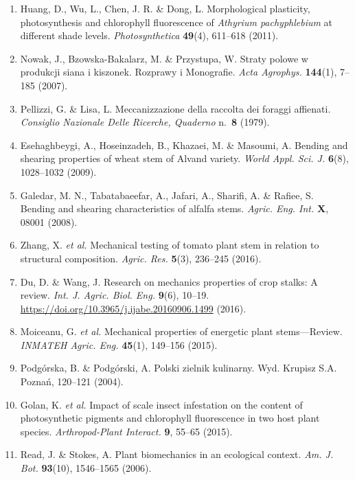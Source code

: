 \documentclass[
]{article}
\begin{document}
\begin{enumerate}
  Kalaji, H. M. \emph{et al.} Chlorophyll \emph{a} fluorescence as a
  tool to monitor physiological status of plants under abiotic stress
  conditions. \emph{Acta Physiol. Plant.} \textbf{38}(102), 1--11
  (2016).
\item
  Huang, D., Wu, L., Chen, J. R. \& Dong, L. Morphological plasticity,
  photosynthesis and chlorophyll fluorescence of \emph{Athyrium
  pachyphlebium} at different shade levels. \emph{Photosynthetica}
  \textbf{49}(4), 611--618 (2011).
\item
  Nowak, J., Bzowska-Bakalarz, M. \& Przystupa, W. Straty polowe w
  produkcji siana i kiszonek. Rozprawy i Monografie. \emph{Acta
  Agrophys.} \textbf{144}(1), 7--185 (2007).
\item
  Pellizzi, G. \& Lisa, L. Meccanizzazione della raccolta dei foraggi
  affienati. \emph{Consiglio Nazionale Delle Ricerche, Quaderno}
  n.~\textbf{8} (1979).
\item
  Esehaghbeygi, A., Hoseinzadeh, B., Khazaei, M. \& Masoumi, A. Bending
  and shearing properties of wheat stem of Alvand variety. \emph{World
  Appl. Sci. J.} \textbf{6}(8), 1028--1032 (2009).
\item
  Galedar, M. N., Tabatabaeefar, A., Jafari, A., Sharifi, A. \& Rafiee,
  S. Bending and shearing characteristics of alfalfa stems. \emph{Agric.
  Eng. Int.} \textbf{X}, 08001 (2008).
\item
  Zhang, X. \emph{et al.} Mechanical testing of tomato plant stem in
  relation to structural composition. \emph{Agric. Res.} \textbf{5}(3),
  236--245 (2016).
\item
  Du, D. \& Wang, J. Research on mechanics properties of crop stalks: A
  review. \emph{Int. J. Agric. Biol. Eng.} \textbf{9}(6), 10--19.
  \url{https://doi.org/10.3965/j.ijabe.20160906.1499} (2016).
\item
  Moiceanu, G. \emph{et al.} Mechanical properties of energetic plant
  stems---Review. \emph{INMATEH Agric. Eng.} \textbf{45}(1), 149--156
  (2015).
\item
  Podgórska, B. \& Podgórski, A. Polski zielnik kulinarny. Wyd. Krupisz
  S.A. Poznań, 120--121 (2004).
\item
  Golan, K. \emph{et al.} Impact of scale insect infestation on the
  content of photosynthetic pigments and chlorophyll fluorescence in two
  host plant species. \emph{Arthropod-Plant Interact.} \textbf{9},
  55--65 (2015).
\item
  Read, J. \& Stokes, A. Plant biomechanics in an ecological context.
  \emph{Am. J. Bot.} \textbf{93}(10), 1546--1565 (2006).

\end{enumerate}
\end{document}
